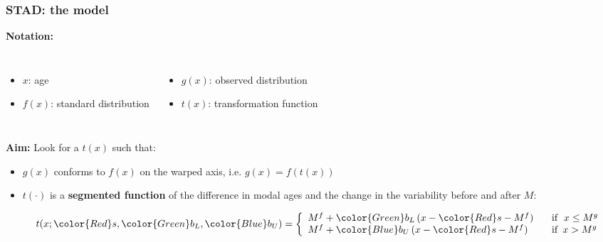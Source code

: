 \documentclass[12pt, xcolor=table]{beamer}  %
\begin{document}

\begin{frame}[noframenumbering]\frametitle{STAD: the model}
	
	\textbf{Notation:}
	
	\begin{columns}
		\begin{itemize}
			\item $x$: age 
			\item $f(x)$: standard distribution			
		\end{itemize}
		\begin{itemize}
			\item $g(x)$: observed distribution	 
			\item $t(x)$: transformation function		
			
		\end{itemize}		
	\end{columns}
	
	\bigskip 
	\bigskip
	
	\textbf{Aim:} Look for a $t(x)$ such that: 
	
	\begin{itemize}
		\item $g(x)$ conforms to $f(x)$ on the warped axis, i.e. $g(x) = f(t(x))$ 
		
		\item $t(\cdot)$ is a \textbf{segmented function} of the difference in modal ages and the change in the variability before and after $M$:
		
		
		\vspace{-0.4cm}
		
		\begin{equation*}\label{eqtx}
			t(x;{\color{Red}s},{\color{Green} b_{L}},{\color{Blue}
				b_{U}}) = \left\{ 
			\begin{array}{ll}
				M^{f} + {\color{Green} b_{L}}\, (x - {\color{Red}s} - M^{f}) \;\;\; & \mathrm{if} \; \; x \leq M^{g} \\
				M^{f} + {\color{Blue} b_{U}}\, (x - {\color{Red}s} - M^{f})  \;\;\; & \mathrm{if} \; \, x >  M^{g} \\
			\end{array}
			\right.
		\end{equation*}	
		
	\end{itemize}
	
\end{frame}
\end{document}
